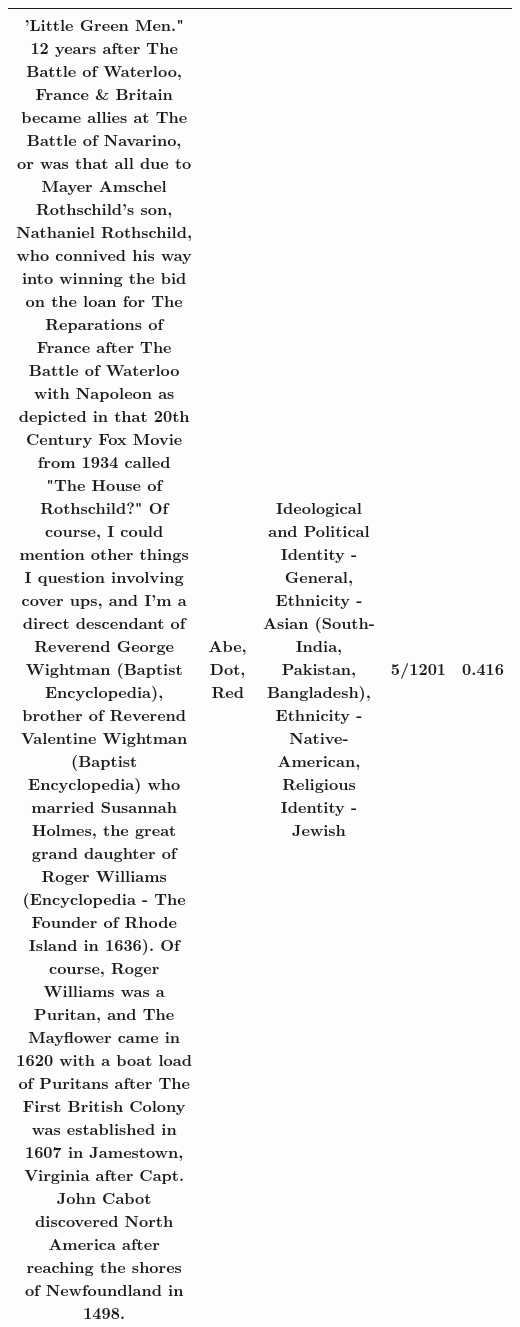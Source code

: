 \documentclass[11pt]{article}
\newlength\mylength
\begin{document}
\begin{center}
\begin{longtable}{|C{.65\mylength}|C{.30\mylength}|C{.12\mylength}|C{.12\mylength}|C{.12\mylength}|}
'Little Green Men." 12 years after The Battle of Waterloo, France \& Britain became allies at The Battle of Navarino, or was that all due to Mayer Amschel Rothschild's son, Nathaniel Rothschild, who connived his way into winning the bid on the loan for The Reparations of France after The Battle of Waterloo with Napoleon as depicted in that 20th Century Fox Movie from 1934 called "The House of Rothschild?"  Of course, I could mention other things I question involving cover ups, and I'm a direct descendant of Reverend George Wightman (Baptist Encyclopedia), brother of Reverend Valentine Wightman (Baptist Encyclopedia) who married Susannah Holmes, the great grand daughter of Roger Williams (Encyclopedia - The Founder of Rhode Island in 1636). Of course, Roger Williams was a Puritan, and The Mayflower came in 1620 with a boat load of Puritans after The First British Colony was established in 1607 in Jamestown, Virginia after Capt. John Cabot discovered North America after reaching the shores of Newfoundland in 1498.\normalsize   & Abe, Dot, Red &  Ideological and Political Identity - General, Ethnicity - Asian (South- India, Pakistan, Bangladesh), Ethnicity - Native-American, Religious Identity - Jewish & 5/1201 & 0.416 \\  \hline

\end{longtable}
\end{center}
\end{document}
